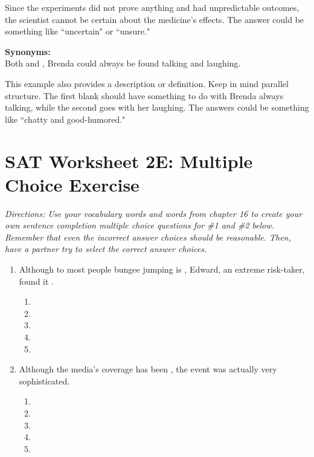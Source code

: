 \bigskip
Since the experiments did not prove anything and had unpredictable outcomes, the scientist cannot be certain about the medicine's effects.
The answer could be something like ``uncertain" or ``unsure."

\bigskip
\textbf{Synonyms:}\\
Both \longline and \longline, Brenda could always be found talking and laughing.

\bigskip
This example also provides a description or definition.  Keep in mind parallel structure.  The first blank should have something to do with Brenda always talking, while the second goes with her laughing.  
The answers could be something like ``chatty and good-humored."

\vfill
\newpage

\section[Practice]{SAT Worksheet 2E: Multiple Choice Exercise}
\textit{Directions: Use your vocabulary words and words from chapter 16 to create your own sentence completion multiple choice questions for \#1 and \#2 below. Remember that even the incorrect answer choices should be reasonable. Then, have a partner try to select the correct answer choices. }

\bigskip
\begin{enumerate}
\item Although to most people bungee jumping is \longline, Edward, an extreme risk-taker, found it \longline.
\begin{enumerate}[label=(\Alph*)]
\item
\item
\item
\item
\item
\end{enumerate}

\item{Although the media's coverage has been \longline, the event was actually very sophisticated.}
\begin{enumerate}[label=(\Alph*)]
\item
\item
\item
\item
\item
\end{enumerate}
\end{enumerate}
\pagebreak


